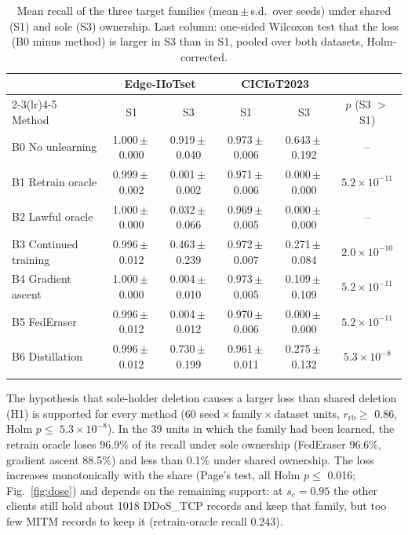 \documentclass[pdflatex,sn-mathphys-num,iicol]{sn-jnl}
\begin{document}
\begin{table}[t]
\caption{Mean recall of the three target families (mean\,$\pm$\,s.d.\ over seeds) under shared (S1) and sole (S3) ownership. Last column: one-sided Wilcoxon test that the loss (B0 minus method) is larger in S3 than in S1, pooled over both datasets, Holm-corrected.}\label{tab:rq1}
\scriptsize
\setlength{\tabcolsep}{3pt}
\begin{tabular*}{\textwidth}{@{\extracolsep\fill}lccccc}
\toprule
 & \multicolumn{2}{c}{Edge-IIoTset} & \multicolumn{2}{c}{CICIoT2023} & \\
\cmidrule(lr){2-3}\cmidrule(lr){4-5}
Method & S1 & S3 & S1 & S3 & $p$ (S3 $>$ S1) \\
\midrule
B0 No unlearning & 1.000\,$\pm$\,0.000 & 0.919\,$\pm$\,0.040 & 0.973\,$\pm$\,0.006 & 0.643\,$\pm$\,0.192 & -- \\
B1 Retrain oracle & 0.999\,$\pm$\,0.002 & 0.001\,$\pm$\,0.002 & 0.971\,$\pm$\,0.006 & 0.000\,$\pm$\,0.000 & $5.2\times10^{-11}$ \\
B2 Lawful oracle & 1.000\,$\pm$\,0.000 & 0.032\,$\pm$\,0.066 & 0.969\,$\pm$\,0.005 & 0.000\,$\pm$\,0.000 & -- \\
B3 Continued training & 0.996\,$\pm$\,0.012 & 0.463\,$\pm$\,0.239 & 0.972\,$\pm$\,0.007 & 0.271\,$\pm$\,0.084 & $2.0\times10^{-10}$ \\
B4 Gradient ascent~\cite{halimi2022,kwon2026} & 1.000\,$\pm$\,0.000 & 0.004\,$\pm$\,0.010 & 0.973\,$\pm$\,0.005 & 0.109\,$\pm$\,0.109 & $5.2\times10^{-11}$ \\
B5 FedEraser~\cite{liu2021federaser} & 0.996\,$\pm$\,0.012 & 0.004\,$\pm$\,0.012 & 0.970\,$\pm$\,0.006 & 0.000\,$\pm$\,0.000 & $5.2\times10^{-11}$ \\
B6 Distillation~\cite{wu2022distill} & 0.996\,$\pm$\,0.012 & 0.730\,$\pm$\,0.199 & 0.961\,$\pm$\,0.011 & 0.275\,$\pm$\,0.132 & $5.3\times10^{-8}$ \\
\botrule
\end{tabular*}
\end{table}

The hypothesis that sole-holder deletion causes a larger loss than shared deletion (H1) is supported for every method (60 seed\,$\times$\,family\,$\times$\,dataset units, $r_{\mathrm{rb}}\ge$ 0.86, Holm $p\le$ $5.3\times10^{-8}$). In the 39 units in which the family had been learned, the retrain oracle loses 96.9\% of its recall under sole ownership (FedEraser 96.6\%, gradient ascent 88.5\%) and less than 0.1\% under shared ownership. The loss increases monotonically with the share (Page's test, all Holm $p\le$ 0.016; Fig.~\ref{fig:dose}) and depends on the remaining support: at $s_c=0.95$ the other clients still hold about 1018 DDoS\_TCP records and keep that family, but too few MITM records to keep it (retrain-oracle recall 0.243).
\end{document}
